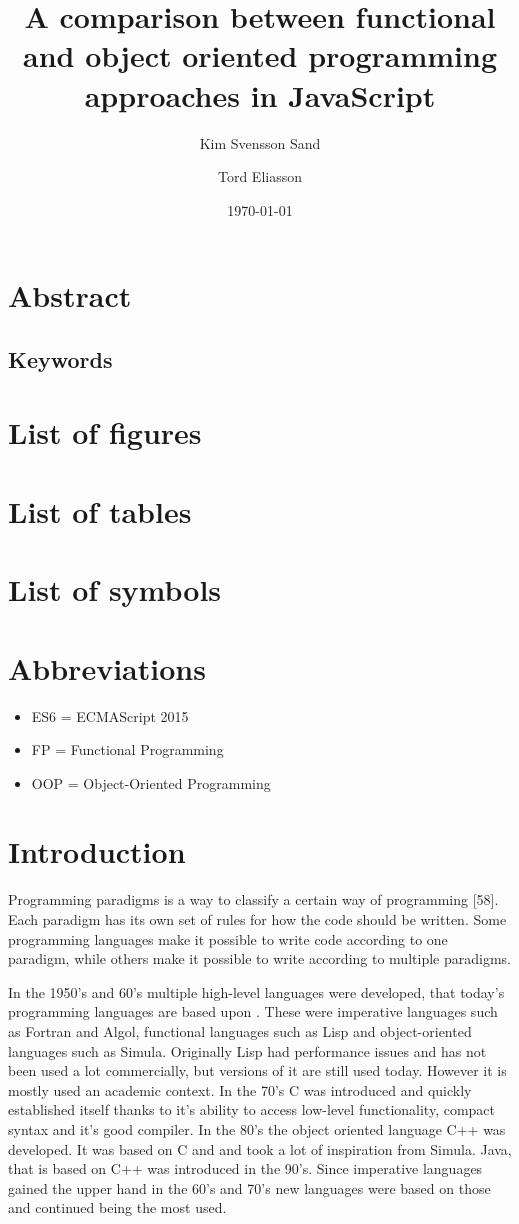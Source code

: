 \documentclass {article}
\title{A comparison between functional and object oriented programming approaches in JavaScript}
\date{\today}
\author{
Kim Svensson Sand \and Tord Eliasson
}
\begin{document}
\maketitle
{}
\newpage
\tableofcontents
\newpage
{}
\section{Abstract}
\subsection{Keywords}
\section{List of figures}
\section{List of tables}
\section{List of symbols}
\section{Abbreviations}
\begin{itemize}[leftmargin=*]
\item [ ] ES6 = ECMAScript 2015
\item [ ] FP = Functional Programming
\item [ ] OOP = Object-Oriented Programming
\end{itemize}

\section{Introduction}
Programming paradigms is a way to classify a certain way of programming [58]. Each paradigm has its own set of rules for how the code should be written. Some programming languages make it possible to write code according to one paradigm,  while others make it possible to write according to multiple paradigms. 

In the 1950's and 60's multiple high-level languages were developed, that today's programming languages are based upon \cite{gabmar}. These were imperative languages such as Fortran and Algol, functional languages such as Lisp and object-oriented languages such as Simula. Originally Lisp had performance issues and has not been used a lot commercially, but versions of it are still used today. However it is mostly used an academic context. In the 70's C was introduced and quickly established itself thanks to it's ability to access low-level functionality, compact syntax and it's good compiler. In the 80's the object oriented language C++ was developed. It was based on C and and took a lot of inspiration from Simula. Java, that is based on C++ was introduced in the 90's. Since imperative languages gained the upper hand in the 60's and 70's new languages were based on those and continued being the most used. 
\end{document}
